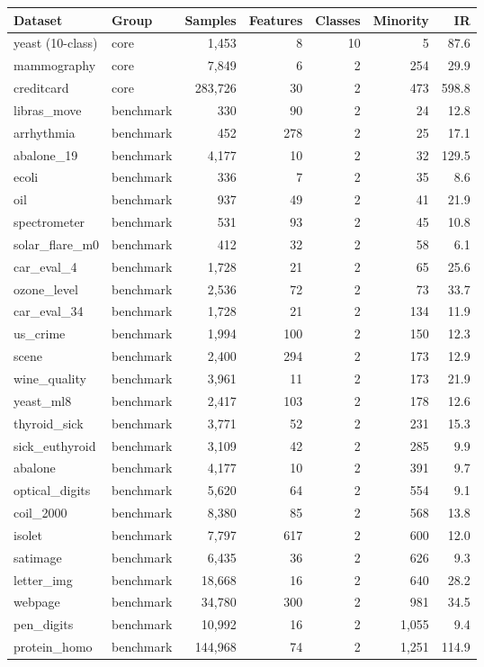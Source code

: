 \begin{tabular}{llrrrrr}
\toprule
Dataset & Group & Samples & Features & Classes & Minority & IR \\
\midrule
yeast (10-class) & core & 1,453 & 8 & 10 & 5 & 87.6 \\
mammography & core & 7,849 & 6 & 2 & 254 & 29.9 \\
creditcard & core & 283,726 & 30 & 2 & 473 & 598.8 \\
libras\_move & benchmark & 330 & 90 & 2 & 24 & 12.8 \\
arrhythmia & benchmark & 452 & 278 & 2 & 25 & 17.1 \\
abalone\_19 & benchmark & 4,177 & 10 & 2 & 32 & 129.5 \\
ecoli & benchmark & 336 & 7 & 2 & 35 & 8.6 \\
oil & benchmark & 937 & 49 & 2 & 41 & 21.9 \\
spectrometer & benchmark & 531 & 93 & 2 & 45 & 10.8 \\
solar\_flare\_m0 & benchmark & 412 & 32 & 2 & 58 & 6.1 \\
car\_eval\_4 & benchmark & 1,728 & 21 & 2 & 65 & 25.6 \\
ozone\_level & benchmark & 2,536 & 72 & 2 & 73 & 33.7 \\
car\_eval\_34 & benchmark & 1,728 & 21 & 2 & 134 & 11.9 \\
us\_crime & benchmark & 1,994 & 100 & 2 & 150 & 12.3 \\
scene & benchmark & 2,400 & 294 & 2 & 173 & 12.9 \\
wine\_quality & benchmark & 3,961 & 11 & 2 & 173 & 21.9 \\
yeast\_ml8 & benchmark & 2,417 & 103 & 2 & 178 & 12.6 \\
thyroid\_sick & benchmark & 3,771 & 52 & 2 & 231 & 15.3 \\
sick\_euthyroid & benchmark & 3,109 & 42 & 2 & 285 & 9.9 \\
abalone & benchmark & 4,177 & 10 & 2 & 391 & 9.7 \\
optical\_digits & benchmark & 5,620 & 64 & 2 & 554 & 9.1 \\
coil\_2000 & benchmark & 8,380 & 85 & 2 & 568 & 13.8 \\
isolet & benchmark & 7,797 & 617 & 2 & 600 & 12.0 \\
satimage & benchmark & 6,435 & 36 & 2 & 626 & 9.3 \\
letter\_img & benchmark & 18,668 & 16 & 2 & 640 & 28.2 \\
webpage & benchmark & 34,780 & 300 & 2 & 981 & 34.5 \\
pen\_digits & benchmark & 10,992 & 16 & 2 & 1,055 & 9.4 \\
protein\_homo & benchmark & 144,968 & 74 & 2 & 1,251 & 114.9 \\
\bottomrule
\end{tabular}
